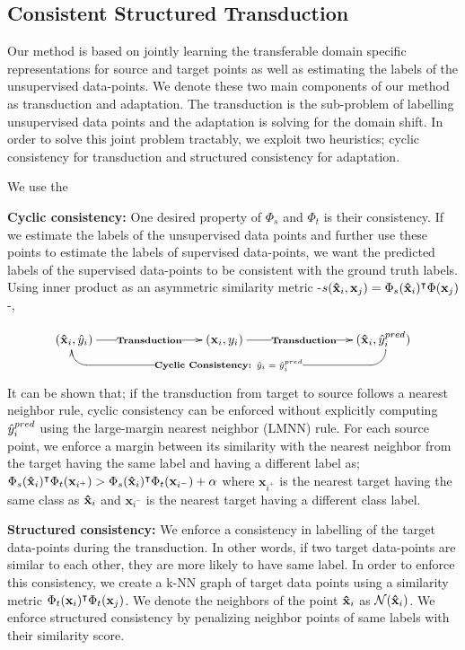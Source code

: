 \subsection{Consistent Structured Transduction}
Our method is based on jointly learning the transferable domain specific representations for source and target points as well as estimating the labels of the unsupervised data-points. We denote these two main components of our method as transduction and adaptation. The transduction is the sub-problem of labelling unsupervised data points and the adaptation is solving for the domain shift. In order to solve this joint problem tractably, we exploit two heuristics; cyclic consistency for transduction and structured consistency for adaptation. 

We use the 



\textbf{Cyclic consistency:} One desired property of  $\Phi_s$ and $\Phi_t$ is their consistency. If we estimate the labels of the unsupervised data points and further use these points to estimate the labels of supervised data-points, we want the predicted labels of the supervised data-points to be consistent with the ground truth labels. Using inner product as an asymmetric similarity metric -$s(\mathbf{\hat{x}}_i, \mathbf{x}_j) = \Phi_s(\mathbf{\hat{x}}_i)^\intercal \Phi(\mathbf{x}_j)$-,

\begin{displaymath}
    \xymatrix{
        (\xsi,\ysi) \ar@{<-}@<-2pt>`d[r] `[rrrrrr]|{\textbf{Cyclic Consistency: $\ysi = \ysi^{pred}$}} [rrrrrr]  \ar[rrr]|{\textbf{Transduction}}     &&& (\xui, \yui) \ar[rrr]|{\textbf{Transduction}} &&&  (\xsi,\ysi^{pred}) }
\end{displaymath}

It can be shown that; if the transduction from target to source follows a nearest neighbor rule, cyclic consistency can be enforced without explicitly computing $\hat{y}_i^{pred}$ using the large-margin nearest neighbor (LMNN)\cite{lmnn} rule. For each source point, we enforce a margin between its similarity with the nearest neighbor from the target having the same label and having a different label as; $ \Phi_s(\mathbf{\hat{x}}_i)^\intercal \Phi_t(\mathbf{x}_{i^+}) > \Phi_s(\mathbf{\hat{x}}_i)^\intercal \Phi_t(\mathbf{x}_{i^-}) + \alpha$ where $\mathbf{x}_{i^+}$ is the nearest target having the same class as $\mathbf{\hat{x}}_i$ and $\mathbf{x}_{i^-}$ is the nearest target having a different class label. 


\textbf{Structured consistency:} We enforce a consistency in labelling of the target data-points during the transduction. In other words, if two target data-points are similar to each other, they are more likely to have same label. In order to enforce this consistency, we create a k-NN graph of target data points using a similarity metric $\Phi_t(\mathbf{x}_i)^\intercal \Phi_t(\mathbf{x}_j)$. We denote the neighbors of the point $\mathbf{\hat{x}}_i$ as $\mathcal{N}(\mathbf{\hat{x}}_i)$. We enforce structured consistency by penalizing neighbor points of same labels with their similarity score. 

